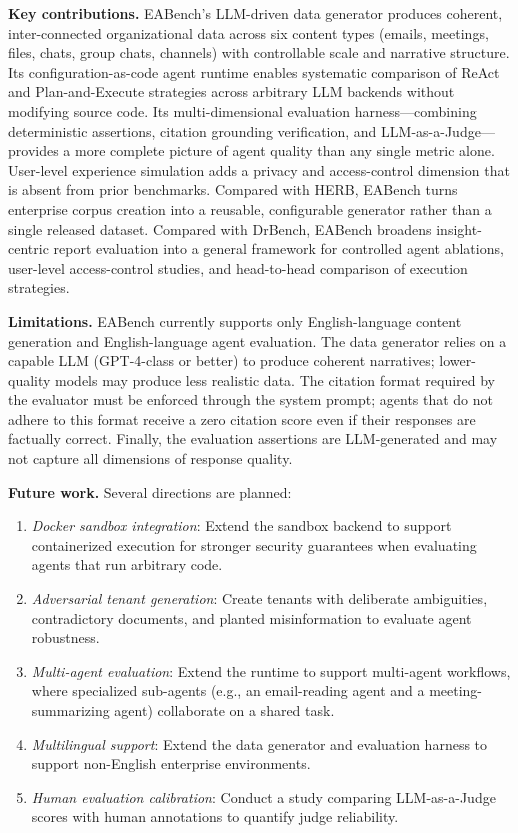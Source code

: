 \documentclass[10pt,twocolumn]{article}
\begin{document}
\textbf{Key contributions.}
EABench's LLM-driven data generator produces coherent, inter-connected
organizational data across six content types (emails, meetings, files, chats,
group chats, channels) with controllable scale and narrative structure.  Its
configuration-as-code agent runtime enables systematic comparison of ReAct and
Plan-and-Execute strategies across arbitrary LLM backends without modifying
source code.  Its multi-dimensional evaluation harness---combining deterministic
assertions, citation grounding verification, and LLM-as-a-Judge---provides a
more complete picture of agent quality than any single metric alone.
User-level experience simulation adds a privacy and access-control dimension
that is absent from prior benchmarks.
Compared with HERB, EABench turns enterprise corpus creation into a reusable,
configurable generator rather than a single released dataset.  Compared with
DrBench, EABench broadens insight-centric report evaluation into a general
framework for controlled agent ablations, user-level access-control studies, and
head-to-head comparison of execution strategies.

\textbf{Limitations.}
EABench currently supports only English-language content generation and
English-language agent evaluation.  The data generator relies on a capable LLM
(GPT-4-class or better) to produce coherent narratives; lower-quality models
may produce less realistic data.  The citation format required by the evaluator
must be enforced through the system prompt; agents that do not adhere to this
format receive a zero citation score even if their responses are factually
correct.  Finally, the evaluation assertions are LLM-generated and may not
capture all dimensions of response quality.

\textbf{Future work.}
Several directions are planned:

\begin{enumerate}[leftmargin=*,itemsep=2pt]
  \item \emph{Docker sandbox integration}: Extend the sandbox backend to
    support containerized execution for stronger security guarantees when
    evaluating agents that run arbitrary code.
  \item \emph{Adversarial tenant generation}: Create tenants with deliberate
    ambiguities, contradictory documents, and planted misinformation to
    evaluate agent robustness.
  \item \emph{Multi-agent evaluation}: Extend the runtime to support
    multi-agent workflows, where specialized sub-agents (e.g., an
    email-reading agent and a meeting-summarizing agent) collaborate on a
    shared task.
  \item \emph{Multilingual support}: Extend the data generator and evaluation
    harness to support non-English enterprise environments.
  \item \emph{Human evaluation calibration}: Conduct a study comparing
    LLM-as-a-Judge scores with human annotations to quantify judge
    reliability.
\end{enumerate}
\end{document}

